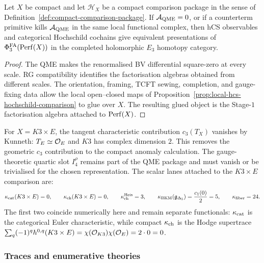 \begin{corollary}
\label{cor:compact-presentation-package}
Let $X$ be compact and let $\mathcal H_X$ be a compact comparison
package in the sense of Definition~\ref{def:compact-comparison-package}.
If $\mathcal A_{\mathrm{QME}}=0$, or if a counterterm primitive kills
$\mathcal A_{\mathrm{QME}}$ in the same local functional complex, then hCS
observables and categorical Hochschild cochains give equivalent
presentations of $\Phi^{\mathrm{FA}}_3(\mathrm{Perf}(X))$ in the completed
holomorphic $E_3$ homotopy category.
\end{corollary}

\begin{proof}
The QME makes the renormalised BV differential square-zero at every
scale. RG compatibility identifies the factorisation algebras obtained
from different scales. The orientation, framing, TCFT sewing,
completion, and gauge-fixing data allow the local open--closed maps of
Proposition~\ref{prop:local-hcs-hochschild-comparison} to glue over
$X$. The resulting glued object is the Stage-$1$ factorisation algebra
attached to $\mathrm{Perf}(X)$.
\end{proof}

\begin{remark}
\label{rmk:k3xe-anomaly}
For $X=K3\times E$, the tangent characteristic contribution
$c_3(T_X)$ vanishes by Kunneth: $T_E\simeq\mathcal{O}_E$ and $K3$ has complex
dimension $2$. This removes the geometric $c_3$ contribution to the
compact anomaly calculation. The gauge-theoretic quartic slot
$I_4^\rho$ remains part of the QME package and must vanish or be
trivialised for the chosen representation. The scalar lanes attached
to the $K3\times E$ comparison are:
\[
  \kappa_{\mathrm{cat}}(K3\times E)=0,\qquad
  \kappa_{\mathrm{ch}}(K3\times E)=0,\qquad
  \kappa_{\mathrm{ch}}^{\mathrm{Heis}}=3,\qquad
  \kappa_{\mathrm{BKM}}(\mathfrak g_{\Delta_5})=\frac{c_1(0)}2=5,\qquad
  \kappa_{\mathrm{fiber}}=24.
\]
The first two coincide numerically here and remain separate functionals:
$\kappa_{\mathrm{cat}}$ is the categorical Euler characteristic, while compact
$\kappa_{\mathrm{ch}}$ is the Hodge supertrace
$\sum_q(-1)^q h^{0,q}(K3\times E)=
\chi(\mathcal{O}_{K3})\chi(\mathcal{O}_E)=2\cdot0=0$.
\end{remark}

\subsubsection{Traces and enumerative theories}
\label{wn:subsubsec:trace-identities}

